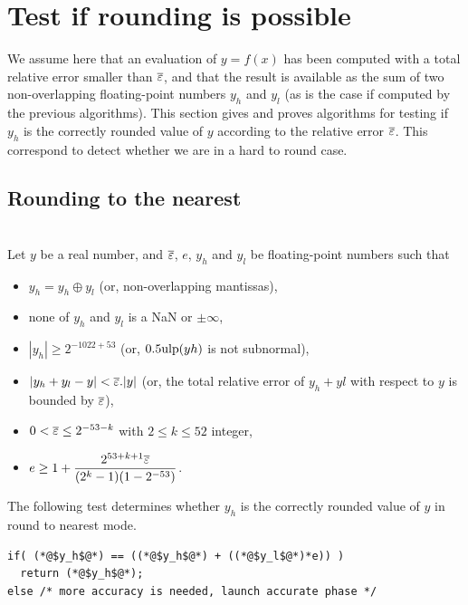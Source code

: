 \section{Test if rounding is possible
\label{section:testrounding}}

We assume here that an evaluation of $y=f(x)$ has been computed with a
total relative error smaller than ${\overline{\varepsilon}}$, and that the result is
available as the sum of two non-overlapping floating-point numbers
$y_h$ and $y_l$ (as is the case if computed by the previous
algorithms). This section gives and proves algorithms for testing if
$y_h$ is the correctly rounded value of $y$ according to the relative
error ${\overline{\varepsilon}}$. This correspond to detect whether we are in a hard
to round case.




\subsection{Rounding to the nearest}

\begin{theorem}
\label{th:roundingRN1}
~\\
Let $y$ be a real number, and  ${\overline{\varepsilon}}$, $e$, $y_h$ and $y_l$ be
  floating-point numbers such that 
  \begin{itemize}
  \item $y_h=y_h\oplus y_l$ (or, non-overlapping mantissas),
  \item none of $y_h$ and $y_l$ is a  NaN or $\pm \infty$,
  \item $|y_h|\ge 2^{-1022+53}$ (or, $0.5\mbox{ulp}(yh)$ is not subnormal), 
  \item $|y_h+y_l - y| <{\overline{\varepsilon}}.|y|$ (or, the total relative error of $y_h+yl$ with respect to $y$ is bounded by ${\overline{\varepsilon}}$),
  \item $0<{\overline{\varepsilon}} \le 2^{-53-k}$ with $2\le k \le 52$ integer,
  \item $e\ge 1+  \dfrac{2^{53+k+1}{\overline{\varepsilon}}}{(2^{k}-1)(1-2^{-53})}$.
\end{itemize}

The following test determines whether $y_h$ is the
  correctly rounded value of $y$ in  round to nearest mode.

\begin{lstlisting}[caption={Test for rounding to the nearest},
  firstnumber=1]
if( (*@$y_h$@*) == ((*@$y_h$@*) + ((*@$y_l$@*)*e)) )
  return (*@$y_h$@*);
else /* more accuracy is needed, launch accurate phase */
\end{lstlisting}
\end{theorem}

